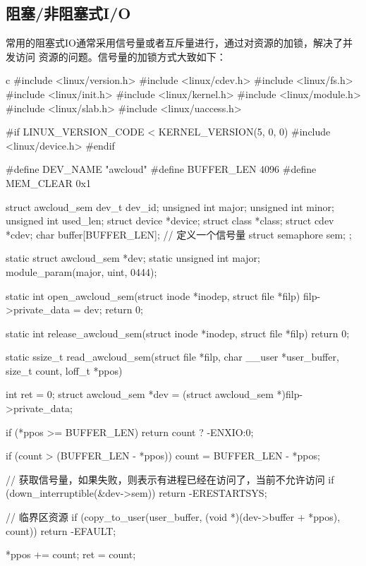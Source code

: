 \subsection{阻塞/非阻塞式I/O}
常用的阻塞式IO通常采用信号量或者互斥量进行，通过对资源的加锁，解决了并发访问
资源的问题。信号量的加锁方式大致如下：
\begin{code-block}{c}
#include <linux/version.h>
#include <linux/cdev.h>
#include <linux/fs.h>
#include <linux/init.h>
#include <linux/kernel.h>
#include <linux/module.h>
#include <linux/slab.h>
#include <linux/uaccess.h>

#if LINUX_VERSION_CODE < KERNEL_VERSION(5, 0, 0)
#include <linux/device.h>
#endif

#define DEV_NAME "awcloud"
#define BUFFER_LEN 4096
#define MEM_CLEAR 0x1

struct awcloud_sem {
        dev_t             dev_id;
        unsigned int      major;
        unsigned int      minor;
        unsigned int      used_len;
        struct device     *device;
        struct class      *class;
        struct cdev       *cdev;
        char              buffer[BUFFER_LEN];
        // 定义一个信号量
        struct semaphore  sem;
};

static struct awcloud_sem *dev;
static unsigned int major;
module_param(major, uint, 0444);

static int open_awcloud_sem(struct inode *inodep, struct file *filp)
{
        filp->private_data = dev;
        return 0;
}

static int release_awcloud_sem(struct inode *inodep, struct file *filp)
{
        return 0;
}

static ssize_t read_awcloud_sem(struct file *filp,
        char __user *user_buffer, size_t count, loff_t *ppos)
{
        int ret = 0;
        struct awcloud_sem *dev = (struct awcloud_sem *)filp->private_data;

        if (*ppos >= BUFFER_LEN) {
                return count ? -ENXIO:0;
        }

        if (count > (BUFFER_LEN - *ppos)) {
                count = BUFFER_LEN - *ppos;
        }

        // 获取信号量，如果失败，则表示有进程已经在访问了，当前不允许访问
        if (down_interruptible(&dev->sem)) {
                return -ERESTARTSYS;
        }

        // 临界区资源
        if (copy_to_user(user_buffer, (void *)(dev->buffer + *ppos), count)) {
                return -EFAULT;
        }

        *ppos += count;
        ret = count;

}
\end{code-block}
